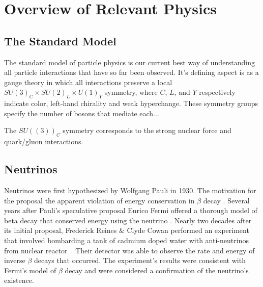 
\chapter{Overview of Relevant Physics}

\ifpdf
    \graphicspath{{physics/figures/PNG/}{physics/figures/PDF/}{physics/figures/}}
\else
    \graphicspath{{physics/figures/EPS/}{physics/figures/}}
\fi

\section{The Standard Model}
The standard model of particle physics is our current best way of understanding
all particle interactions that have so far been observed.
It's defining aspect is as a gauge theory in which all interactions
preserve a local $SU{(3)}_C \times SU{(2)}_L \times U{(1)}_Y$ symmetry, where
$C$, $L$, and $Y$ respectively indicate color, left-hand chirality and weak hyperchange.
These symmetry groups specify the number of bosons that mediate each...

The $SU({(3)})_C$ symmetry corresponds to the strong nuclear force and quark/gluon
interactions.

\section{Neutrinos}
Neutrinos were first hypothesized by Wolfgang Pauli in 1930.
The motivation for the proposal the apparent violation of energy
conservation in $\beta$ decay \citep{pauli_letter}.
Several years after Pauli's speculative proposal Enrico Fermi offered
a thorough model of beta decay that conserved energy using the neutrino
\citep{fermi_beta_decay}.
Nearly two decades after its initial proposal, Frederick Reines \&
Clyde Cowan performed an experiment that involved bombarding a tank of cadmium
doped water with anti-neutrinos from nuclear reactor~\citep{cowan_reines}.
Their detector was able to observe the rate and energy of inverse $\beta$
decays that occurred.
The experiment's results were consistent with Fermi's model of $\beta$ decay and were
considered a confirmation of the neutrino's existence.

